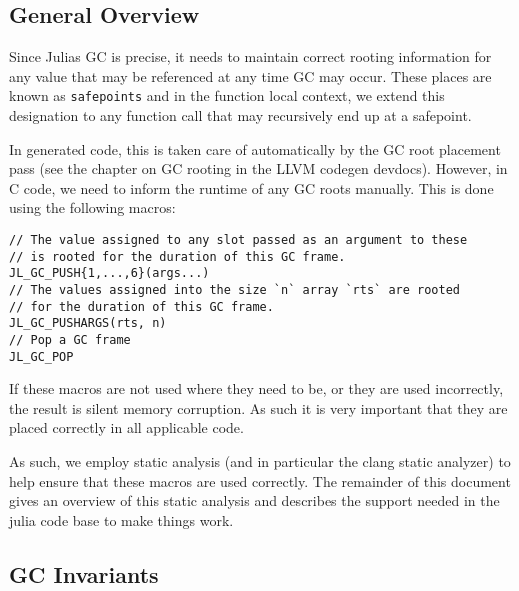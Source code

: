 \hypertarget{9968293705752668266}{}


\subsection{General Overview}



Since Julia{\textquotesingle}s GC is precise, it needs to maintain correct rooting information for any value that may be referenced at any time GC may occur. These places are known as \texttt{safepoints} and in the function local context, we extend this designation to any function call that may recursively end up at a safepoint.



In generated code, this is taken care of automatically by the GC root placement pass (see the chapter on GC rooting in the LLVM codegen devdocs). However, in C code, we need to inform the runtime of any GC roots manually. This is done using the following macros:




\begin{lstlisting}
// The value assigned to any slot passed as an argument to these
// is rooted for the duration of this GC frame.
JL_GC_PUSH{1,...,6}(args...)
// The values assigned into the size `n` array `rts` are rooted
// for the duration of this GC frame.
JL_GC_PUSHARGS(rts, n)
// Pop a GC frame
JL_GC_POP
\end{lstlisting}



If these macros are not used where they need to be, or they are used incorrectly, the result is silent memory corruption. As such it is very important that they are placed correctly in all applicable code.



As such, we employ static analysis (and in particular the clang static analyzer) to help ensure that these macros are used correctly. The remainder of this document gives an overview of this static analysis and describes the support needed in the julia code base to make things work.



\hypertarget{15061338110065038518}{}


\subsection{GC Invariants}



